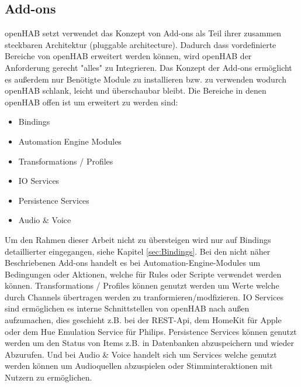 \subsection{Add-ons}
openHAB setzt verwendet das Konzept von Add-ons als Teil ihrer zusammen steckbaren Architektur (pluggable architecture). Dadurch dass vordefinierte Bereiche von openHAB erweitert werden können, wird openHAB der Anforderung gerecht "alles" zu Integrieren. Das Konzept der Add-ons ermöglicht es außerdem nur Benötigte Module zu installieren bzw. zu verwenden wodurch openHAB schlank, leicht und überschaubar bleibt. Die Bereiche in denen openHAB offen ist um erweitert zu werden sind:
\begin{itemize}
	\item Bindings
	\item Automation Engine Modules
	\item Transformations / Profiles
	\item IO Services
	\item Persistence Services
	\item Audio \& Voice
\end{itemize}
Um den Rahmen dieser Arbeit nicht zu übersteigen wird nur auf Bindings detaillierter eingegangen, siehe Kapitel \ref{sec:Bindings}. Bei den nicht näher Beschriebenen Add-ons handelt es bei Automation-Engine-Modules um Bedingungen oder Aktionen, welche für Rules oder Scripte verwendet werden können. Transformations / Profiles können genutzt werden um Werte welche durch Channels übertragen werden zu tranformieren/modfizieren. IO Services sind ermöglichen es interne Schnittstellen von openHAB nach außen aufzumachen, dies geschieht z.B. bei der REST-Api, dem HomeKit für Apple oder dem Hue Emulation Service für Philips. Persistence Services können genutzt werden um den Status von Items z.B. in Datenbanken abzuspeichern und wieder Abzurufen. Und bei Audio \& Voice handelt sich um Services welche genutzt werden können um Audioquellen abzuspielen oder Stimminteraktionen mit Nutzern zu ermöglichen. 

